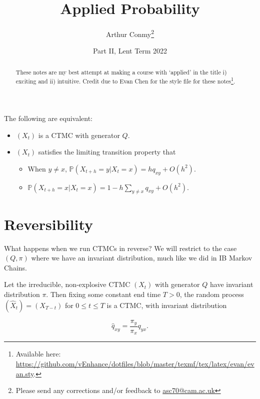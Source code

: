 \documentclass[11pt]{scrartcl}
\begin{document}
\title{Applied Probability}
\author{Arthur Conmy\footnote{Please send any corrections and/or feedback to \url{asc70@cam.ac.uk}}}
\date{Part II, Lent Term 2022}

\maketitle
\begin{abstract}
These notes are my best attempt at making a course with `applied' in the title i) exciting and ii) intuitive.
Credit  due to Evan Chen for the style file for these notes\footnote{Available here: \url{https://github.com/vEnhance/dotfiles/blob/master/texmf/tex/latex/evan/evan.sty}.}.
\end{abstract}

\begin{theorem}
\label{CTMC TFAE}
The following are equivalent:

\begin{itemize}
\item $(X_t)$ is a CTMC with generator $Q$.
\item $(X_t)$ satisfies the limiting transition property that 
\begin{itemize}
    \item When $y \neq x$, $\mathbb{ P}(X_{t+h} = y | X_t = x) = h q_{xy} + O(h^2)$.
    \item $\mathbb{ P}( X_{t+h} = x | X_t = x ) = 1 - h\sum_{y \neq x} q_{xy} + O(h^2)$.
\end{itemize}
\end{itemize}

\end{theorem}

\section{Reversibility}

What happens when we run CTMCs in reverse? We will restrict to the case $(Q, \pi)$ where we have an invariant distribution, much like we did in IB Markov Chains.

\begin{theorem}[Reversibility]
Let the irreducible, non-explosive CTMC $(X_t)$ with generator $Q$ have invariant distribution $\pi $. Then fixing some constant end time $T>0$, the random process $(\hat{X}_t) = (X_{T-t})$ for $0 \le t \le T$ is a CTMC, with invariant distribution 

\begin{equation}
    \hat{q}_{xy} = \frac{\pi_y}{\pi_x} q_{yx}.
\end{equation}
\end{theorem}
\end{document}
